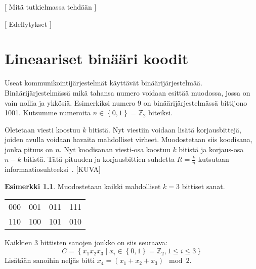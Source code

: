 \documentclass[a4paper,12pt,leqno,oneside]{report} %
\theoremstyle{plain}
\theoremstyle{definition}
\newtheorem{esimerkki}{Esimerkki}[chapter]
\theoremstyle{remark}
\numberwithin{equation}{chapter}
\newcommand*{\Zset}{\mathbb{Z}}  %
\begin{document}
    [ Mitä tutkielmassa tehdään ]


    [ Edellytykset ]

    \chapter{Lineaariset binääri koodit}\label{ch: Lineaariset binääri koodit}

    Useat kommunikointijärjestelmät käyttävät binäärijärjestelmää. Binäärijärjestelmässä mikä tahansa numero voidaan esittää muodossa, jossa on vain nollia ja ykkösiä. Esimerkiksi numero 9 on binäärijärjestelmässä bittijono 1001. Kutsumme numeroita $n \in \left\{ 0, 1 \right\} = \Zset_2$ biteiksi.

    Oletetaan viesti koostuu $k$ bitistä. Nyt viestiin voidaan lisätä korjausbittejä, joiden avulla voidaan havaita mahdolliset virheet. Muodostetaan siis koodisana, jonka pituus on $n$. Nyt koodisanan viesti-osa koostuu $k$ bitistä ja korjaus-osa $n-k$ bitistä. Tätä pituuden ja korjausbittien suhdetta $R = \frac{k}{n}$ kutsutaan informaatiosuhteeksi~\cite[s.~267]{GW}.
    [KUVA]
    \begin{esimerkki}
        Muodostetaan kaikki mahdolliset $k = 3$ bittiset sanat.
        \begin{center}
            \begin{tabular}[t]{llll}
                000 & 001 & 011 & 111 \\
                110 & 100 & 101 & 010 \\
            \end{tabular}
        \end{center}
        Kaikkien 3 bittisten sanojen joukko on siis seuraava:
        \[
            C = \left\{ x_1x_2x_3 \mid  x_i \in \left\{0,1\right\} = \Zset_2, 1 \le i \le 3 \right\}
        \]
        Lisätään sanoihin neljäs bitti $x_4 = (x_1 + x_2 + x_3) \mod2$.
    \end{esimerkki}
\end{document}
